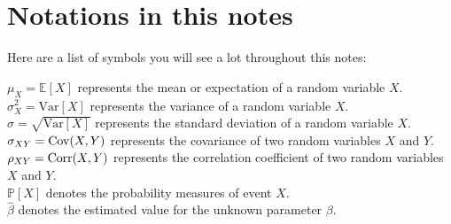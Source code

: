 \chapter*{Notations in this notes}

Here are a list of symbols you will see a lot throughout this notes:

$\mu_X = \mathbb{E}[X]$ represents the mean or expectation of a random variable $X$.\\

$\sigma^2_X = \text{Var}[X]$ represents the variance of a random variable $X$.\\

$\sigma = \sqrt{\text{Var}[X]}$ represents the standard deviation of a random variable $X$.\\

$\sigma_{XY} = \operatorname*{Cov}(X,Y)$ represents the covariance of two random variables $X$ and $Y$.\\

$\rho_{XY} = \operatorname*{Corr}(X,Y)$ represents the correlation coefficient of two random variables $X$ and $Y$.\\

$\mathbb{P}[X]$ denotes the probability measures of event $X$.\\

$\widehat{\beta}$ denotes the estimated value for the unknown parameter $\beta$.